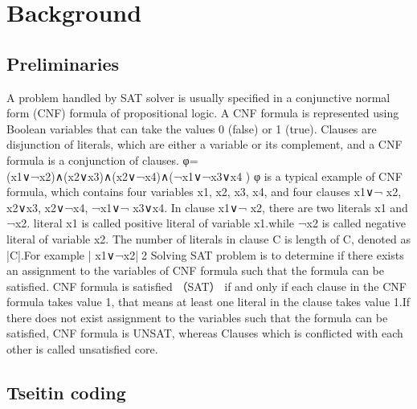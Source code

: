 \documentclass[runningheads,a4paper]{llncs}
\begin{document}
\section{Background}
\subsection{Preliminaries}

A problem handled by SAT solver is usually specified in a conjunctive normal form (CNF) formula of propositional logic. A CNF formula is represented using Boolean variables that can take the values 0 (false) or 1 (true). Clauses are disjunction of literals, which are either a variable or its complement, and a CNF formula is a conjunction of clauses.
φ=(x1∨¬x2)∧(x2∨x3)∧(x2∨¬x4)∧(¬x1∨¬x3∨x4 )
φ is a typical example of CNF formula, which contains four variables x1, x2, x3, x4, and four clauses x1∨¬ x2, x2∨x3, x2∨¬x4, ¬x1∨¬ x3∨x4. In clause x1∨¬ x2, there are two literals x1 and ¬x2. literal x1 is called positive literal of variable x1.while ¬x2 is called negative literal of variable x2.
The number of literals in clause C is length of C, denoted as |C|.For example | x1∨¬x2|2
Solving SAT problem is to determine if there exists an assignment to the variables of CNF formula such that the formula can be satisfied. CNF formula is satisfied （SAT） if and only if each clause in the CNF formula takes value 1, that means at least one literal in the clause takes value 1.If there does not exist assignment to the variables such that the formula can be satisfied, CNF formula is UNSAT, whereas Clauses which is conflicted with each other is called unsatisfied core.

\subsection{Tseitin coding}
\end{document}
